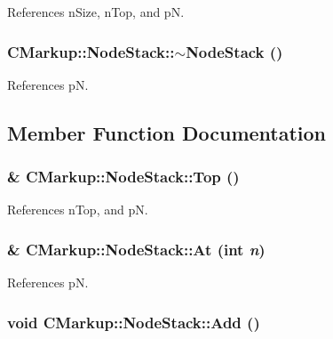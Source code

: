 References nSize, nTop, and pN.
\subsubsection[$\sim$NodeStack]{\setlength{\rightskip}{0pt plus 5cm}CMarkup::NodeStack::$\sim$NodeStack ()\hspace{0.3cm}{\tt  [inline]}}\label{structCMarkup_1_1NodeStack_6bd62bb0b4c4596016a00eade46cd5ca}




References pN.

\subsection{Member Function Documentation}
\subsubsection[Top]{\& CMarkup::NodeStack::Top ()\hspace{0.3cm}{\tt  [inline]}}\label{structCMarkup_1_1NodeStack_6be20984a9a499498312be0688c54bc5}




References nTop, and pN.
\subsubsection[At]{\& CMarkup::NodeStack::At (int {\em n})\hspace{0.3cm}{\tt  [inline]}}\label{structCMarkup_1_1NodeStack_909848e1d3a591d21820d8ba4f03ee0d}




References pN.
\subsubsection[Add]{\setlength{\rightskip}{0pt plus 5cm}void CMarkup::NodeStack::Add ()\hspace{0.3cm}{\tt  [inline]}}\label{structCMarkup_1_1NodeStack_623cec96b6f3f3e246902d32f62244f8}





